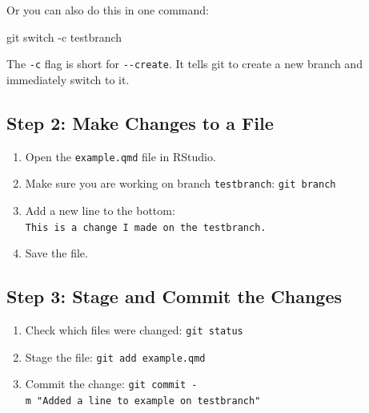 \documentclass[
  11pt,
  letterpaper,
  DIV=11,
  numbers=noendperiod]{scrartcl}
\newenvironment{Shaded}{\begin{snugshade}}{\end{snugshade}}
\newcommand{\AttributeTok}[1]{\textcolor[rgb]{0.40,0.45,0.13}{#1}}
\newcommand{\FunctionTok}[1]{\textcolor[rgb]{0.28,0.35,0.67}{#1}}
\newcommand{\NormalTok}[1]{\textcolor[rgb]{0.00,0.23,0.31}{#1}}
\providecommand{\tightlist}{%
  \setlength{\itemsep}{0pt}\setlength{\parskip}{0pt}}\usepackage{longtable,booktabs,array}
\let\textttOrig\texttt
\renewcommand{\texttt}[1]{\textttOrig{\colorbox{codebggray}{\textcolor{codefontcolor}{#1}}}}
\begin{document}
Or you can also do this in one command:

\begin{Shaded}
\begin{Highlighting}[]
\FunctionTok{git}\NormalTok{ switch }\AttributeTok{{-}c}\NormalTok{ testbranch}
\end{Highlighting}
\end{Shaded}

\begin{tcolorbox}[enhanced jigsaw, colback=white, colframe=quarto-callout-tip-color-frame, bottomtitle=1mm, titlerule=0mm, toptitle=1mm, breakable, opacitybacktitle=0.6, opacityback=0, leftrule=.75mm, colbacktitle=quarto-callout-tip-color!10!white, title=\textcolor{quarto-callout-tip-color}{\faLightbulb}\hspace{0.5em}{Tip}, arc=.35mm, coltitle=black, toprule=.15mm, rightrule=.15mm, bottomrule=.15mm, left=2mm]

The \texttt{-c} flag is short for \texttt{-\/-create}. It tells git to
create a new branch and immediately switch to it.

\end{tcolorbox}

\subsection{Step 2: Make Changes to a
File}\label{step-2-make-changes-to-a-file}

\begin{enumerate}
\def\labelenumi{\arabic{enumi}.}
\tightlist
\item
  Open the \texttt{example.qmd} file in RStudio.
\item
  Make sure you are working on branch \texttt{testbranch}:
  \texttt{git\ branch}
\item
  Add a new line to the bottom:
  \texttt{This\ is\ a\ change\ I\ made\ on\ the\ testbranch.}
\item
  Save the file.
\end{enumerate}

\subsection{Step 3: Stage and Commit the
Changes}\label{step-3-stage-and-commit-the-changes}

\begin{enumerate}
\def\labelenumi{\arabic{enumi}.}
\tightlist
\item
  Check which files were changed: \texttt{git\ status}
\item
  Stage the file: \texttt{git\ add\ example.qmd}
\item
  Commit the change:
  \texttt{git\ commit\ -m\ "Added\ a\ line\ to\ example\ on\ testbranch"}
\end{enumerate}
\end{document}
